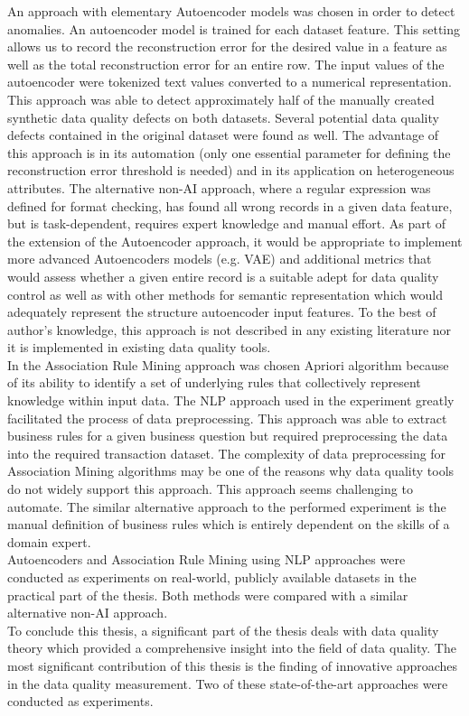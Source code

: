 \hspace*{5mm} An approach with elementary Autoencoder models was chosen in order to detect anomalies. An autoencoder model is trained for each dataset feature. This setting allows us to record the reconstruction error for the desired value in a feature as well as the total reconstruction error for an entire row. The input values of the autoencoder were tokenized text values converted to a numerical representation. This approach was able to detect approximately half of the manually created synthetic data quality defects on both datasets. Several potential data quality defects contained in the original dataset were found as well. The advantage of this approach is in its automation (only one essential parameter for defining the reconstruction error threshold is needed) and in its application on heterogeneous attributes. The alternative non-AI approach, where a regular expression was defined for format checking, has found all wrong records in a given data feature, but is task-dependent, requires expert knowledge and manual effort. As part of the extension of the Autoencoder approach, it would be appropriate to implement more advanced Autoencoders models (e.g. VAE) and additional metrics that would assess whether a given entire record is a suitable adept for data quality control as well as with other methods for semantic representation which would adequately represent the structure autoencoder input features. To the best of author's knowledge, this approach is not described in any existing literature nor it is implemented in existing data quality tools.\\
\hspace*{5mm} In the Association Rule Mining approach was chosen Apriori algorithm because of its ability to identify a set of underlying rules that collectively represent knowledge within input data. The NLP approach used in the experiment greatly facilitated the process of data preprocessing. This approach was able to extract business rules for a given business question but required preprocessing the data into the required transaction dataset. The complexity of data preprocessing for Association Mining algorithms may be one of the reasons why data quality tools do not widely support this approach. This approach seems challenging to automate. The similar alternative approach to the performed experiment is the manual definition of business rules which is entirely dependent on the skills of a domain expert.\\
\hspace*{5mm} Autoencoders and Association Rule Mining using NLP approaches were conducted as experiments on real-world, publicly available datasets in the practical part of the thesis. Both methods were compared with a similar alternative non-AI approach.\\
\hspace*{5mm} To conclude this thesis, a significant part of the thesis deals with data quality theory which provided a comprehensive insight into the field of data quality. The most significant contribution of this thesis is the finding of innovative approaches in the data quality measurement. Two of these state-of-the-art approaches were conducted as experiments.
